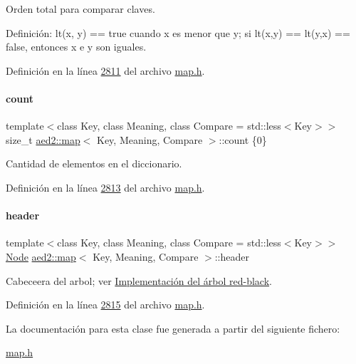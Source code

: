 Orden total para comparar claves. 

Definición\+: lt(x, y) == true cuando x es menor que y; si lt(x,y) == lt(y,x) == false, entonces x e y son iguales. 

Definición en la línea \hyperlink{map_8h_source_l02811}{2811} del archivo \hyperlink{map_8h_source}{map.\+h}.

\mbox{\label{classaed2_1_1map_a44236c4f16cdc20a10759862b198bde4_a44236c4f16cdc20a10759862b198bde4}} 
\paragraph{\texorpdfstring{count}{count}}
{\footnotesize\ttfamily template$<$class Key, class Meaning, class Compare = std\+::less$<$\+Key$>$$>$ \\
size\+\_\+t \hyperlink{classaed2_1_1map}{aed2\+::map}$<$ Key, Meaning, Compare $>$\+::count \{0\}\hspace{0.3cm}{\ttfamily [private]}}



Cantidad de elementos en el diccionario. 



Definición en la línea \hyperlink{map_8h_source_l02813}{2813} del archivo \hyperlink{map_8h_source}{map.\+h}.

\mbox{\label{classaed2_1_1map_a92d93f905c8ad73fba18fdc7e8915cce_a92d93f905c8ad73fba18fdc7e8915cce}} 
\paragraph{\texorpdfstring{header}{header}}
{\footnotesize\ttfamily template$<$class Key, class Meaning, class Compare = std\+::less$<$\+Key$>$$>$ \\
\hyperlink{structaed2_1_1map_1_1Node}{Node} \hyperlink{classaed2_1_1map}{aed2\+::map}$<$ Key, Meaning, Compare $>$\+::header\hspace{0.3cm}{\ttfamily [private]}}



Cabeceera del arbol; ver \hyperlink{Implementacion}{Implementación del árbol red-\/black}. 



Definición en la línea \hyperlink{map_8h_source_l02815}{2815} del archivo \hyperlink{map_8h_source}{map.\+h}.



La documentación para esta clase fue generada a partir del siguiente fichero\+:\begin{DoxyCompactItemize}
\item 
\hyperlink{map_8h}{map.\+h}\end{DoxyCompactItemize}
